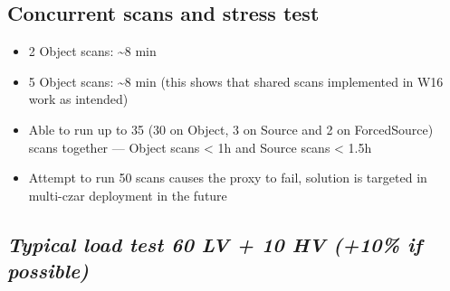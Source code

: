 \documentclass[DM,toc]{lsstdoc}
\begin{document}
\subsection{Concurrent scans and stress
test}\label{concurrent-scans-and-stress-test}

\begin{itemize}
\item
  2 Object scans: \textasciitilde{}8 min
\item
  5 Object scans: \textasciitilde{}8 min (this shows that shared scans
  implemented in W16 work as intended)
\item
  Able to run up to 35 (30 on Object, 3 on Source and 2 on ForcedSource)
  scans together --- Object scans \textless{} 1h and Source scans
  \textless{} 1.5h
\item
  Attempt to run 50 scans causes the proxy to fail, solution is targeted
  in multi-czar deployment in the future
\end{itemize}

\subsection{\emph{Typical load test 60 LV +
10 HV (+10\% if
possible)}}\label{typical-load-test-60-lv-10-hv-10-if-possible}
\end{document}

